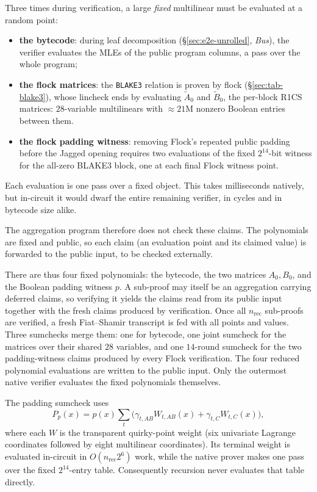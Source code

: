 \documentclass[11pt]{article}
\begin{document}
Three times during verification, a large \emph{fixed} multilinear must be evaluated at a random point:
\begin{itemize}
\item \textbf{the bytecode}: during leaf decomposition (\S\ref{sec:e2e-unrolled}, \emph{Bus}), the verifier evaluates the MLEs of the public program columns, a pass over the whole program;
\item \textbf{the flock matrices}: the \texttt{BLAKE3} relation is proven by flock (\S\ref{sec:tab-blake3}), whose lincheck ends by evaluating $\widetilde A_0$ and $\widetilde B_0$, the per-block R1CS matrices: $28$-variable multilinears with $\approx 21\mathrm{M}$ nonzero Boolean entries between them.
\item \textbf{the flock padding witness}: removing Flock's repeated public padding before the Jagged opening requires two evaluations of the fixed $2^{14}$-bit witness for the all-zero BLAKE3 block, one at each final Flock witness point.
\end{itemize}
Each evaluation is one pass over a fixed object. This takes milliseconds natively, but in-circuit it would dwarf the entire remaining verifier, in cycles and in bytecode size alike.

The aggregation program therefore does not check these claims. The polynomials are fixed and public, so each claim (an evaluation point and its claimed value) is forwarded to the public input, to be checked externally.

There are thus four fixed polynomials: the bytecode, the two matrices $A_0,B_0$, and the Boolean padding witness $p$. A sub-proof may itself be an aggregation carrying deferred claims, so verifying it yields the claims read from its public input together with the fresh claims produced by verification. Once all $n_{\mathrm{rec}}$ sub-proofs are verified, a fresh Fiat--Shamir transcript is fed with all points and values. Three sumchecks merge them: one for bytecode, one joint sumcheck for the matrices over their shared $28$ variables, and one $14$-round sumcheck for the two padding-witness claims produced by every Flock verification. The four reduced polynomial evaluations are written to the public input. Only the outermost native verifier evaluates the fixed polynomials themselves.

The padding sumcheck uses
\[
  P_p(x)=p(x)\sum_t\bigl(\gamma_{t,AB}W_{t,AB}(x)+\gamma_{t,C}W_{t,C}(x)\bigr),
\]
where each $W$ is the transparent quirky-point weight (six univariate Lagrange coordinates followed by eight multilinear coordinates). Its terminal weight is evaluated in-circuit in $O(n_{\mathrm{rec}}2^6)$ work, while the native prover makes one pass over the fixed $2^{14}$-entry table. Consequently recursion never evaluates that table directly.
\end{document}
